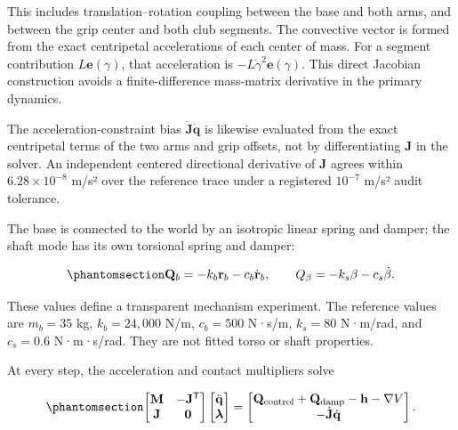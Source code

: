 \documentclass[
  letterpaper,
]{report}
\begin{document}
This includes translation--rotation coupling between the base and both
arms, and between the grip center and both club segments. The convective
vector is formed from the exact centripetal accelerations of each center
of mass. For a segment contribution \(L\mathbf e(\gamma)\), that
acceleration is \(-L\dot\gamma^2\mathbf e(\gamma)\). This direct
Jacobian construction avoids a finite-difference mass-matrix derivative
in the primary dynamics.

The acceleration-constraint bias \(\dot{\mathbf J}\dot{\mathbf q}\) is
likewise evaluated from the exact centripetal terms of the two arms and
grip offsets, not by differentiating \(\mathbf J\) in the solver. An
independent centered directional derivative of \(\mathbf J\) agrees
within \(6.28\times10^{-8}\) m/s² over the reference trace under a
registered \(10^{-7}\) m/s² audit tolerance.

The base is connected to the world by an isotropic linear spring and
damper; the shaft mode has its own torsional spring and damper:

\begin{equation}\phantomsection\label{eq-coupled-passive-actions}{
\mathbf Q_b=-k_b\mathbf r_b-c_b\dot{\mathbf r}_b,
\qquad
Q_\beta=-k_s\beta-c_s\dot\beta.
}\end{equation}

These values define a transparent mechanism experiment. The reference
values are \(m_b=35\) kg, \(k_b=24{,}000\) N/m, \(c_b=500\) N·s/m,
\(k_s=80\) N·m/rad, and \(c_s=0.6\) N·m·s/rad. They are not fitted torso
or shaft properties.

At every step, the acceleration and contact multipliers solve

\begin{equation}\phantomsection\label{eq-coupled-kkt}{
\begin{bmatrix}
\mathbf M&-\mathbf J^\mathsf T\\
\mathbf J&\mathbf 0
\end{bmatrix}
\begin{bmatrix}\ddot{\mathbf q}\\\boldsymbol\lambda\end{bmatrix}
=
\begin{bmatrix}
\mathbf Q_{\mathrm{control}}+\mathbf Q_{\mathrm{damp}}
-\mathbf h-\nabla V\\
-\dot{\mathbf J}\dot{\mathbf q}
\end{bmatrix}.
}\end{equation}
\end{document}
